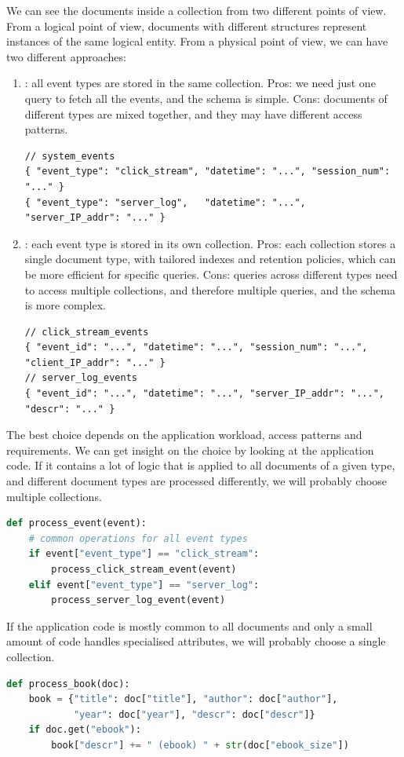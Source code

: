 We can see the documents inside a collection from two different points of view. From a logical point of view, documents with different structures represent instances of the same logical entity. From a physical point of view, we can have two different approaches:
\begin{enumerate}
  \item {}: all event types are stored in the same collection. Pros: we need just one query to fetch all the events, and the schema is simple. Cons: documents of different types are mixed together, and they may have different access patterns.
\begin{lstlisting}
// system_events
{ "event_type": "click_stream", "datetime": "...", "session_num": "..." }
{ "event_type": "server_log",   "datetime": "...", "server_IP_addr": "..." }
\end{lstlisting}
  \item {}: each event type is stored in its own collection. Pros: each collection stores a single document type, with tailored indexes and retention policies, which can be more efficient for specific queries. Cons: queries across different types need to access multiple collections, and therefore multiple queries, and the schema is more complex.
\begin{lstlisting}
// click_stream_events
{ "event_id": "...", "datetime": "...", "session_num": "...", "client_IP_addr": "..." }
// server_log_events
{ "event_id": "...", "datetime": "...", "server_IP_addr": "...", "descr": "..." }
\end{lstlisting}
\end{enumerate}

The best choice depends on the application workload, access patterns and requirements. We can get insight on the choice by looking at the application code. If it contains a lot of logic that is applied to all documents of a given type, and different document types are processed differently, we will probably choose multiple collections.
\begin{lstlisting}[language=Python]
def process_event(event):
    # common operations for all event types
    if event["event_type"] == "click_stream":
        process_click_stream_event(event)
    elif event["event_type"] == "server_log":
        process_server_log_event(event)
\end{lstlisting}
If the application code is mostly common to all documents and only a small amount of code handles specialised attributes, we will probably choose a single collection.
\begin{lstlisting}[language=Python]
def process_book(doc):
    book = {"title": doc["title"], "author": doc["author"],
            "year": doc["year"], "descr": doc["descr"]}
    if doc.get("ebook"):
        book["descr"] += " (ebook) " + str(doc["ebook_size"])
\end{lstlisting}

